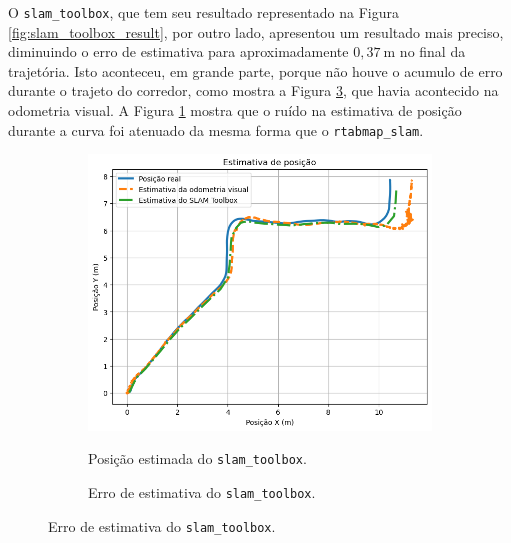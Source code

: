 \documentclass[repeatfields,xlists,xpacks,oneside,yearsonly]{ufrgscca}
\begin{document}
O \texttt{slam\_toolbox}, que tem seu resultado representado na
Figura \ref{fig:slam_toolbox_result}, por outro lado, apresentou um
resultado mais preciso, diminuindo o erro de estimativa para
aproximadamente $0,37~\si{\meter}$ no final da trajetória. Isto
aconteceu, em grande parte, porque não houve o acumulo de erro
durante o trajeto do corredor, como mostra a Figura
\ref{fig:localization_slam_toolbox_error}, que havia acontecido na
odometria visual. A Figura \ref{fig:localization_slam_toolbox} mostra
que o ruído na estimativa de posição durante a curva foi atenuado da
mesma forma que o \texttt{rtabmap\_slam}.

\begin{figure}[H]
    \caption{Resultado do pacote \texttt{slam\_toolbox}.}
    \label{fig:slam_toolbox_result}
    \begin{subfigure}{0.5\linewidth}
        {
            \centering
            \caption{Posição estimada do \texttt{slam\_toolbox}.}
            \label{fig:localization_slam_toolbox}
            \includegraphics[width=0.98\linewidth]{localization-slam-toolbox-new.png}\\
        }
    \end{subfigure}
    \begin{subfigure}{0.5\linewidth}
        {
            \centering
            \caption{Erro de estimativa do \texttt{slam\_toolbox}.}
            \label{fig:localization_slam_toolbox_error}
}
\end{subfigure}
\end{figure}
\end{document}
